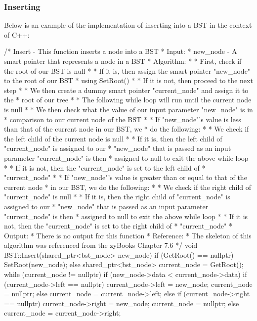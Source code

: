 \begin{highlight}

\subsubsection*{Inserting}

Below is an example of the implementation of inserting into a BST in the context of C++:

\begin{code}
/*  Insert - This function inserts a node into a BST
*   Input:
*     new_node - A smart pointer that represents a node in a BST
*   Algorithm:
*     * First, check if the root of our BST is null
*       * If it is, then assign the smart pointer "new_node" to the root of our BST 
*         using SetRoot()
*       * If it is not, then proceed to the next step
*     * We then create a dummy smart pointer "current_node" and assign it to the 
*       root of our tree
*     * The following while loop will run until the current node is null
*     * We then check what the value of our input parameter "new_node" is in 
*       comparison to our current node of the BST
*     * If "new_node"'s value is less than that of the current node in our BST, we 
*       do the following:
*       * We check if the left child of the current node is null
*         * If it is, then the left child of "current_node" is assigned to our 
*           "new_node" that is passed as an input parameter "current_node" is then 
*           assigned to null to exit the above while loop
*         * If it is not, then the "current_node" is set to the left child of 
*           "current_node"
*     * If "new_node"'s value is greater than or equal to that of the current node 
*       in our BST, we do the following:
*       * We check if the right child of "current_node" is null
*         * If it is, then the right child of "current_node" is assigned to our 
*           "new_node" that is passed as an input parameter "current_node" is then 
*           assigned to null to exit the above while loop
*         * If it is not, then the "current_node" is set to the right child of 
*           "current_node"
*   Output:
*     There is no output for this function
*   Reference:
*     The skeleton of this algorithm was referenced from the zyBooks Chapter 7.6
*/
void BST::Insert(shared_ptr<bst_node> new_node){
    if (GetRoot() == nullptr) {
        SetRoot(new_node);
    }
    else {
        shared_ptr<bst_node> current_node = GetRoot();
        while (current_node != nullptr) {
            if (new_node->data < current_node->data) {
                if (current_node->left == nullptr) {
                    current_node->left = new_node;
                    current_node = nullptr;
                }
                else {
                    current_node = current_node->left;
                }
            }
            else {
                if (current_node->right == nullptr) {
                    current_node->right = new_node;
                    current_node = nullptr;
                }
                else {
                    current_node = current_node->right;
                }
            }
        }
    }
}
\end{code}


\end{highlight}
